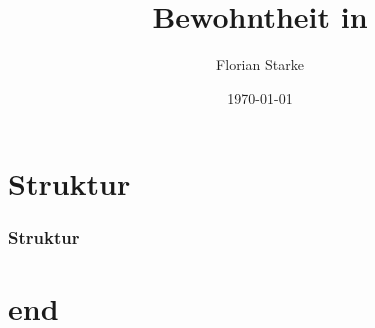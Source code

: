 \documentclass{beamer}
\title{Bewohntheit in \lambdaTwo}
\author{Florian	Starke}
\date{\today}
\begin{document}
\maketitle
\addtocounter{framenumber}{-1}

\section*{Struktur}
\begin{frame}
\frametitle{Struktur}
\tableofcontents 
\end{frame}

\section*{end}
\end{document}
